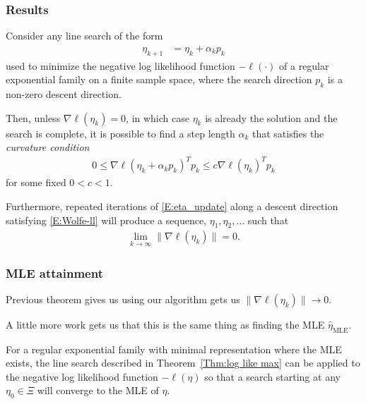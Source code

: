 \documentclass[slidestop,compress, 10pt]{beamer}
\newcommand{\etaMLE}{\hat{\eta}_{\textrm{MLE}}}
\begin{document}
\frame
{
\frametitle{Results}
\begin{theorem} \label{Thm:log like max}
Consider any line search of the form 
\begin{align}
	\eta_{k+1} &= \eta_k + \alpha_k p_k \label{E:eta_update}
\end{align}
used to minimize the negative log likelihood function $-\ell(\cdot)$ of a regular 
exponential family on a finite sample space, where the search direction $p_k$ 
is a non-zero descent direction.

Then, unless $\nabla \ell(\eta_k) = 0$, in which case $\eta_k$ is already the solution 
and the search is complete, it is 
possible to find a step length $\alpha_k$ that satisfies the \emph{curvature 
condition}
\begin{align}
	0 \leq \nabla \ell( \eta_k + \alpha_k p_k)^T p_k  \leq c \nabla \ell(\eta_k)^T p_k  
\label{E:Wolfe-ll}
\end{align}
for some fixed $0 < c < 1$.

Furthermore, repeated iterations of \eqref{E:eta_update} along a descent direction 
satisfying \eqref{E:Wolfe-ll} will produce a sequence, $\eta_1, \eta_2, \ldots$ such 
that
\begin{align*}
	\lim_{k \to \infty} \lVert \nabla \ell(\eta_k) \rVert = 0.
\end{align*}
\end{theorem}
}

\frame
{
\frametitle{MLE attainment}
Previous theorem gives us using our algorithm gets us 
$\lVert \nabla \ell(\eta_k) \rVert \to 0$.  

A little more work gets us that 
this is the same thing as finding the MLE $\etaMLE$.

\begin{theorem} \label{Thm:Line Search works}
For a regular exponential family with minimal representation where the MLE exists, the 
line search described in 
Theorem~\ref{Thm:log like max} can be applied to the negative log likelihood function 
$-\ell(\eta)$ so that a search 
starting at any $\eta_0 \in \Xi$ will converge to the MLE of $\eta$.
\end{theorem}

}
\end{document}
